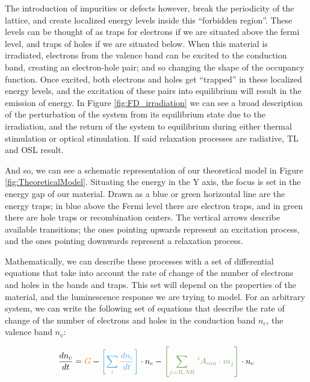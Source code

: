 \vspace{10pt}
The introduction of impurities or defects however, break the periodicity of the lattice, and create localized energy levels inside this ``forbidden region''. These levels can be thought of as traps for electrons if we are situated above the fermi level, and traps of holes if we are situated below. When this material is irradiated, electrons from the valence band can be excited to the conduction band, creating an electron-hole pair; and so changing the shape of the occupancy function. Once excited, both electrons and holes get ``trapped'' in these localized energy levels, and the excitation of these pairs into equilibrium will result in the emission of energy. In Figure \ref{fig:FD_irradiation} we can see a broad description of the perturbation of the system from its equilibrium state due to the irradiation, and the return of the system to equilibrium during either thermal stimulation or optical stimulation. If said relaxation processes are radiative, TL and OSL result. 

\vspace{10pt}

And so, we can see a schematic representation of our theoretical model in Figure \ref{fig:TheoreticalModel}. Situating the energy in the Y axis, the focus is set in the energy gap of our material. Drawn as a blue or green horizontal line are the energy traps; in blue above the Fermi level there are electron traps, and in green there are hole traps or recombination centers. The vertical arrows describe available transitions; the ones pointing upwards represent an excitation process, and the ones pointing downwards represent a relaxation process. 

\vspace{10pt}

Mathematically, we can describe these processes with a set of differential equations that take into account the rate of change of the number of electrons and holes in the bands and traps. This set will depend on the properties of the material, and the luminescence response we are trying to model. For an arbitrary system, we can write the following set of equations that describe the rate of change of the number of electrons and holes in the conduction band $n_c$, the valence band $n_v$:
\vspace{10pt}

\begin{equation} \label{eq:dn_cdt}
  \frac{dn_c}{dt} = \textcolor{orange}{G} - \textcolor{customblue}{\left[\sum_i \frac{dn_i}{dt}\right]} \cdot n_c - \textcolor{customgreen}{\left[ \sum_{j=R, N\!R}\, ^iA_{mn} \cdot m_j \right]} \cdot n_c
\end{equation}


